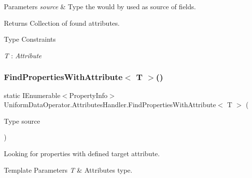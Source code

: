 \begin{DoxyParams}{Parameters}
{\em source} & Type the would by used as source of fields.\\
\hline
\end{DoxyParams}
\begin{DoxyReturn}{Returns}
Collection of found attributes.
\end{DoxyReturn}
\begin{Desc}
\item[Type Constraints]\begin{description}
\item[{\em T} : {\em Attribute}]\end{description}
\end{Desc}
\mbox{\label{class_uniform_data_operator_1_1_attributes_handler_aadbc72ffe71063da1ecd611925f26e16}} 
\subsubsection{\texorpdfstring{Find\+Properties\+With\+Attribute$<$ T $>$()}{FindPropertiesWithAttribute< T >()}}
{\footnotesize\ttfamily static I\+Enumerable$<$Property\+Info$>$ Uniform\+Data\+Operator.\+Attributes\+Handler.\+Find\+Properties\+With\+Attribute$<$ T $>$ (\begin{DoxyParamCaption}\item[{Type}]{source }\end{DoxyParamCaption})\hspace{0.3cm}{\ttfamily [static]}}



Looking for properties with defined target attribute. 


\begin{DoxyTemplParams}{Template Parameters}
{\em T} & Attribute\textquotesingle{}s type.\\
\hline
\end{DoxyTemplParams}

